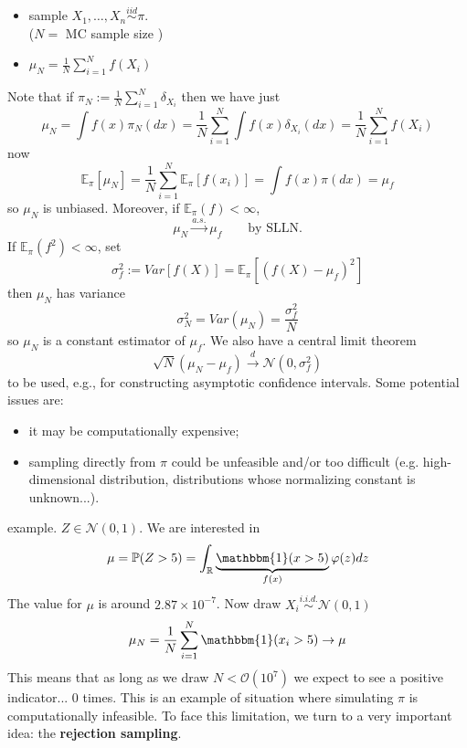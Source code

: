 \documentclass{article}
\begin{document}
	\begin{algorithm}
		\begin{itemize}
			\item sample $X_1, \dots, X_n \stackrel{iid}{\sim}\pi$. \\
			($N=$ MC sample size )
			\item $\mu_N = \frac{1}{N} \sum_{i=1}^N f(X_i) $\\
		\end{itemize}
	\end{algorithm}
	Note that if $\pi_N:= \frac{1}{N} \sum_{i=1}^N \delta_{X_i}$ then we have just 
	\begin{equation*}
		\mu_N = \int f(x) \pi_N (dx) = \frac{1}{N} \sum_{i=1}^N\int f(x)\delta_{X_i}  (dx) = \frac{1}{N} \sum_{i=1}^N f(X_i)
	\end{equation*}
	now 
	\[
	\mathbb{E}_\pi\left[\mu_N\right]=\frac{1}{N}\sum_{i=1}^{N}\mathbb{E}_\pi\left[f(x_i)\right]=\int f(x)\pi(dx)=\mu_f
	\]
	so $\mu_N$ is unbiased. Moreover, if $\mathbb{E}_\pi(f)<\infty$,
	\[
	\mu_N\xrightarrow{a.s.}\mu_f\qquad\text{by SLLN.}
	\]
	If $\mathbb{E}_{\pi} (f^2) < \infty$, set 
	\begin{equation*}
		\sigma_f ^2 := Var [f(X)] = \mathbb{E}_{\pi} [(f(X)- \mu_f)^2]
	\end{equation*}
	then $\mu_N$ has variance 
	\begin{equation*}
		\sigma_N ^2= Var(\mu_N) = \frac{\sigma_f ^2}{N}
	\end{equation*}
	so $\mu_N$ is a constant estimator of $\mu_f$. We also have a central limit theorem
	\begin{equation*}
		\sqrt{N} (\mu_N-\mu_f) \xrightarrow{d} \mathcal{N}(0, \sigma_f ^2)
	\end{equation*}
	to be used, e.g., for constructing asymptotic confidence intervals. 
	Some potential issues are:
	\begin{itemize}
		\item it may be computationally expensive;
		\item sampling directly from $\pi$ could be unfeasible and/or too difficult (e.g. high-dimensional distribution, distributions whose normalizing constant is unknown...).
	\end{itemize}
	example. $Z \in \mathcal{N}(0,1)$. We are interested in 
	\begin{equation*}
		\mu= \mathbb{P}(Z> 5) = \int _{\mathbb{R}}\underbrace{\mathbbm{1}(x >5)}_{\mathclap{f(x)}} \varphi (z) dz
	\end{equation*}
	The value for $\mu$ is around $2.87\times10^{-7}$. Now draw $X_i \stackrel{i.i.d.}{\sim} \mathcal{N}(0,1)$
	\begin{equation*}
		\mu_N = \frac{1}{N} \sum_{i=1}^N \mathbbm{1}(x_i >5) \rightarrow \mu
	\end{equation*}
	This means that as long as we draw $N<\mathcal{O}(10^7)$ we expect to see a positive indicator... 0 times. This is an example of situation where simulating $\pi$ is computationally infeasible. To face this limitation, we turn to a very important idea: the \textbf{rejection sampling}. 
\end{document}
